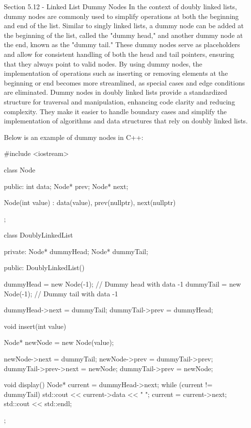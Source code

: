 \begin{notes}{Section 5.12 - Linked List Dummy Nodes}
    In the context of doubly linked lists, dummy nodes are commonly used to simplify operations at both the beginning and end of the list. Similar to singly linked lists, a dummy node can be added at the beginning of the list, called the "dummy head," and another dummy node at the end, known as the "dummy tail." These dummy nodes serve as placeholders and 
    allow for consistent handling of both the head and tail pointers, ensuring that they always point to valid nodes. By using dummy nodes, the implementation of operations such as inserting or removing elements at the beginning or end becomes more streamlined, as special cases and edge conditions are eliminated. Dummy nodes in doubly linked lists provide 
    a standardized structure for traversal and manipulation, enhancing code clarity and reducing complexity. They make it easier to handle boundary cases and simplify the implementation of algorithms and data structures that rely on doubly linked lists.
    
    \begin{highlight}
        Below is an example of dummy nodes in C++:
    
    \begin{code}[C++]
    #include <iostream>
    
    class Node {
    public:
        int data;
        Node* prev;
        Node* next;
    
        Node(int value) : data(value), prev(nullptr), next(nullptr) {}
    };
    
    class DoublyLinkedList {
    private:
        Node* dummyHead;
        Node* dummyTail;
    
    public:
        DoublyLinkedList() {
            dummyHead = new Node(-1);  // Dummy head with data -1
            dummyTail = new Node(-1);  // Dummy tail with data -1
    
            dummyHead->next = dummyTail;
            dummyTail->prev = dummyHead;
        }
    
        void insert(int value) {
            Node* newNode = new Node(value);
    
            newNode->next = dummyTail;
            newNode->prev = dummyTail->prev;
            dummyTail->prev->next = newNode;
            dummyTail->prev = newNode;
        }
    
        void display() {
            Node* current = dummyHead->next;
            while (current != dummyTail) {
                std::cout << current->data << " ";
                current = current->next;
            }
            std::cout << std::endl;
        }
    };
    

\end{code}
\end{highlight}
\end{notes}
